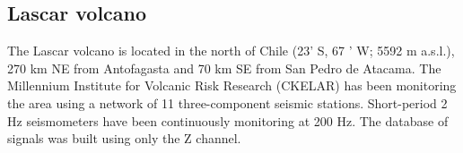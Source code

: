 \documentclass[journal]{IEEEtran}
\begin{document}
\subsection{Lascar volcano}
The Lascar volcano is located in the north of Chile (23' S, 67 ' W; 5592 m a.s.l.), 270 km NE from Antofagasta and 70 km SE from San Pedro de Atacama. The Millennium Institute for Volcanic Risk Research (CKELAR) has been monitoring the area using a network of 11 three-component seismic stations. Short-period 2 Hz seismometers have been continuously monitoring at 200 Hz. The database of signals was built using only the Z channel.
\begin{figure}
  \begin{subfigure}{0.27\textwidth}
    \footnotesize
\end{subfigure}
\end{figure}
\end{document}
